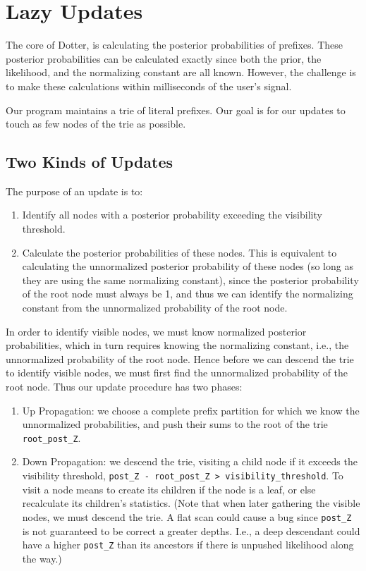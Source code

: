 \chapter{Lazy Updates}
\label{chap:lazy-updates}
The core of Dotter, is calculating the posterior probabilities of prefixes.
These posterior probabilities can be calculated exactly since both the prior, the likelihood, and the normalizing constant are all known.
However, the challenge is to make these calculations within milliseconds of the user's signal.

Our program maintains a trie of literal prefixes. Our goal is for our updates
to touch as few nodes of the trie as possible.

\section{Two Kinds of Updates}
The purpose of an update is to:
\begin{enumerate}
    \item Identify all nodes with a posterior probability exceeding the visibility threshold.
    \item Calculate the posterior probabilities of these nodes.
    This is equivalent to calculating the unnormalized posterior probability of these nodes
    (so long as they are using the same normalizing constant),
    since the posterior probability of the root node must always be 1,
     and thus we can identify the normalizing constant from the unnormalized probability of the root node.
\end{enumerate}

In order to identify visible nodes, we must know normalized posterior probabilities, which in turn requires knowing the normalizing constant, i.e., the unnormalized probability of the root node.
Hence before we can descend the trie to identify visible nodes, we must first find the unnormalized probability of the root node.
Thus our update procedure has two phases:
\begin{enumerate}
    \item Up Propagation: we choose a complete prefix partition for which we know the unnormalized probabilities, and push their sums to the root of the trie \texttt{root\_post\_Z}.
    \item Down Propagation: we descend the trie, visiting a child node if it exceeds the visibility threshold, \texttt{post\_Z - root\_post\_Z > visibility\_threshold}.
    To visit a node means to create its children if the node is a leaf, or else recalculate its children's statistics.
    (Note that when later gathering the visible nodes, we must descend the trie. A flat scan could cause a bug since \texttt{post\_Z} is not guaranteed to be correct a greater depths. I.e.,
    a deep descendant could have a higher \texttt{post\_Z} than its ancestors if there is unpushed likelihood along the way.)
\end{enumerate}

